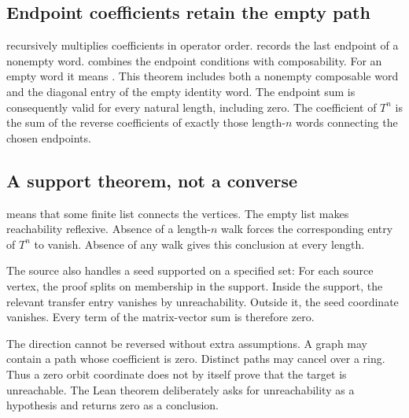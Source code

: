 \subsection{Endpoint coefficients retain the empty path}
 recursively multiplies coefficients in operator order.  records the last endpoint of a nonempty word.  combines the endpoint conditions with composability. For an empty word it means .
This theorem includes both a nonempty composable word and the diagonal entry of the empty identity word. The endpoint sum is consequently valid for every natural length, including zero. The coefficient of $T^n$ is the sum of the reverse coefficients of exactly those length-$n$ words connecting the chosen endpoints.

\subsection{A support theorem, not a converse}
 means that some finite list connects the vertices. The empty list makes reachability reflexive. Absence of a length-$n$ walk forces the corresponding entry of $T^n$ to vanish. Absence of any walk gives this conclusion at every length.

The source also handles a seed supported on a specified set:
For each source vertex, the proof splits on membership in the support. Inside the support, the relevant transfer entry vanishes by unreachability. Outside it, the seed coordinate vanishes. Every term of the matrix-vector sum is therefore zero.

The direction cannot be reversed without extra assumptions. A graph may contain a path whose coefficient is zero. Distinct paths may cancel over a ring. Thus a zero orbit coordinate does not by itself prove that the target is unreachable. The Lean theorem deliberately asks for unreachability as a hypothesis and returns zero as a conclusion.
